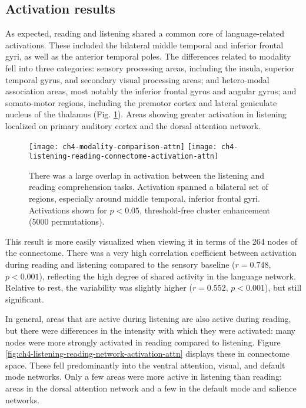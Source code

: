 \subsection{Activation results}

As expected, reading and listening shared a common core of language-related activations. These included the bilateral middle temporal and inferior frontal gyri, as well as the  anterior temporal poles. The differences related to modality fell into three categories: sensory processing areas, including the insula, superior temporal gyrus, and secondary visual processing areas; and hetero-modal association areas, most notably the inferior frontal gyrus and angular gyrus; and somato-motor regions, including the premotor cortex and lateral geniculate nucleus of the thalamus (Fig. \ref{fig:ch4-modality-comparison-attn}). Areas showing greater activation in listening localized on primary auditory cortex and the dorsal attention network.

\begin{figure}[t!]
	\centering
	\texttt{[image: ch4-modality-comparison-attn]}
	\texttt{[image: ch4-listening-reading-connectome-activation-attn]}
    \caption[Large overlap between listening and reading activation]{There was a large overlap in activation between the listening and reading comprehension tasks. Activation spanned a bilateral set of regions, especially around middle temporal, inferior frontal gyri. Activations shown for $p < 0.05$, threshold-free cluster enhancement (5000 permutations).}
	\label{fig:ch4-modality-comparison-attn}
\end{figure}

This result is more easily visualized when viewing it in terms of the 264 nodes of the connectome. There was a very high correlation coefficient between activation during reading and listening compared to the sensory baseline ($r = 0.748$, $p < 0.001$), reflecting the high degree of shared activity in the language network. Relative to rest, the variability was slightly higher ($r = 0.552$, $p < 0.001$), but still significant. 

In general, areas that are active during listening are also active during reading, but there were differences in the intensity with which they were activated: many nodes were more strongly activated in reading compared to listening. Figure \ref{fig:ch4-listening-reading-network-activation-attn} displays these in connectome space. These fell predominantly into the ventral attention, visual, and default mode networks. Only a few areas were more active in listening than reading: areas in the dorsal attention network and a few in the default mode and salience networks. 

